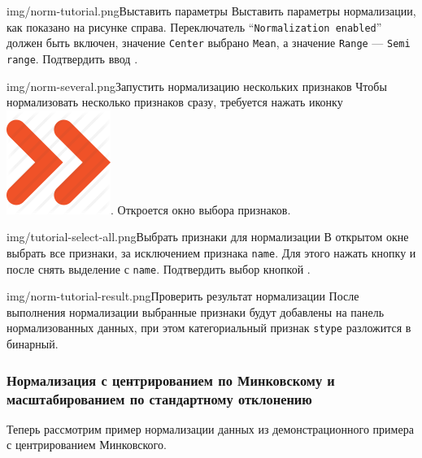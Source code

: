 \documentclass[12pt,tikz]{instruction}
\begin{document}
\begin{steps}
\begin{ist}{img/norm-tutorial.png}{Выставить параметры}
		Выставить параметры нормализации, как показано на рисунке справа. Переключатель ``\texttt{Normalization enabled}'' должен быть включен, значение \texttt{Center} выбрано \texttt{Mean}, а значение \texttt{Range} --- \texttt{Semi range}. Подтвердить ввод . 
	\end{ist}	
	\begin{ist}{img/norm-several.png}{Запустить нормализацию нескольких признаков }
		Чтобы нормализовать несколько признаков сразу, требуется нажать иконку \includegraphics[scale=0.1]{img/norm_all.png}. Откроется окно выбора признаков.
	\end{ist}
	\begin{ist}{img/tutorial-select-all.png}{Выбрать признаки для нормализации}
		В открытом окне выбрать все признаки, за исключением признака \texttt{name}. Для этого нажать кнопку  и после снять выделение с \texttt{name}. Подтвердить выбор кнопкой . \vspace{1cm}
	\end{ist}
	\begin{ist}{img/norm-tutorial-result.png}{Проверить результат нормализации}
		После выполнения нормализации выбранные признаки будут добавлены на панель нормализованных данных, при этом категориальный признак \texttt{stype} разложится в бинарный.
	\end{ist}
\end{steps}

\subsubsection{Нормализация с центрированием по Минковскому и масштабированием по стандартному отклонению}
\label{subsubseq:example_norm2}
Теперь рассмотрим пример нормализации данных из демонстрационного примера с центрированием Минковского.
\end{document}
